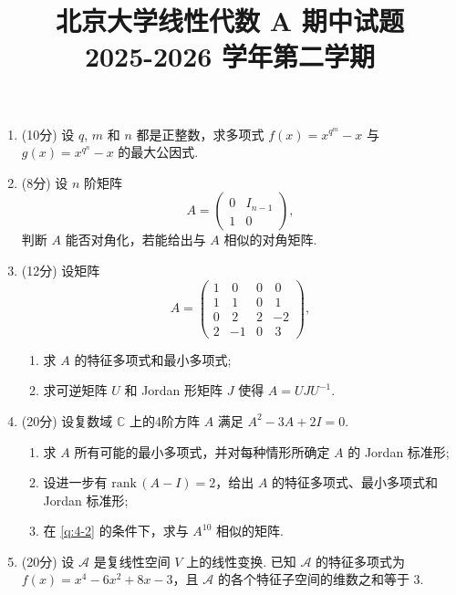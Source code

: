 \documentclass[11pt, a4paper]{article}
\title{\Large 北京大学线性代数 A 期中试题\\[0.5em]{\normalsize 2025-2026 学年第二学期}}
\author{}
\date{}
\begin{document}
\maketitle

 \begin{enumerate}
    \item (10分) 设 $q$, $m$ 和 $n$ 都是正整数，求多项式 $f(x)=x^{q^m}-x$ 与 $g(x)=x^{q^n}-x$ 的最大公因式.
    \item (8分) 设 $n$ 阶矩阵 
        \[
            A=\begin{pmatrix}
                0 & I_{n-1} \\[0.6em]
                1 & 0
            \end{pmatrix},
        \]
        判断 $A$ 能否对角化，若能给出与 $A$ 相似的对角矩阵.
    \item (12分) 设矩阵
        \[
            A=\begin{pmatrix}
                1 & \,0 & 0 & \,0 \\[0.6em]
                1 & \,1 & 0 & \,1 \\[0.6em]
                0 & \,2 & 2 & -2  \\[0.6em]
                2 & -1  & 0 & \,3
            \end{pmatrix},
        \]
        \begin{enumerate}[label=(\arabic*)]
            \item 求 $A$ 的特征多项式和最小多项式;
            \item 求可逆矩阵 $U$ 和 Jordan 形矩阵 $J$ 使得 $A=UJU^{-1}$.
        \end{enumerate}
    \item (20分) 设复数域 $\mathbb{C}$ 上的4阶方阵 $A$ 满足 $A^2-3A+2I=0$.
        \begin{enumerate}[label=(\arabic*)]
            \item 求 $A$ 所有可能的最小多项式，并对每种情形所确定 $A$ 的 Jordan 标准形;
            \item \label{q:4-2} 设进一步有 $\mathrm{rank}\,(A-I)=2$，给出 $A$ 的特征多项式、最小多项式和 Jordan 标准形;
            \item 在 \ref{q:4-2} 的条件下，求与 $A^{10}$ 相似的矩阵.
        \end{enumerate}
    \item (20分) 设 $\mathcal{A}$ 是复线性空间 $V$ 上的线性变换. 已知 $\mathcal{A}$ 的特征多项式为 $f(x)=x^4-6x^2+8x-3$，且 $\mathcal{A}$ 的各个特征子空间的维数之和等于 $3$.
        \begin{enumerate}[label=(\arabic*)]

\end{enumerate}
\end{enumerate}
\end{document}

